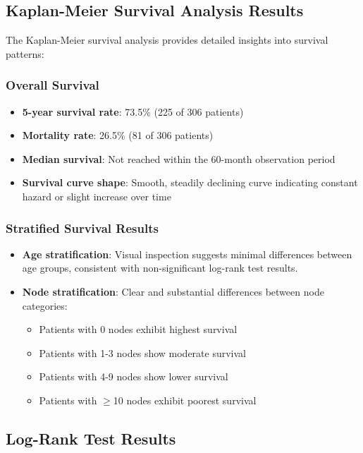 \documentclass[12pt,a4paper]{article}
\begin{document}
\subsection{Kaplan-Meier Survival Analysis Results}

The Kaplan-Meier survival analysis provides detailed insights into survival patterns:

\subsubsection{Overall Survival}

\begin{itemize}
    \item \textbf{5-year survival rate}: 73.5\% (225 of 306 patients)
    \item \textbf{Mortality rate}: 26.5\% (81 of 306 patients)
    \item \textbf{Median survival}: Not reached within the 60-month observation period
    \item \textbf{Survival curve shape}: Smooth, steadily declining curve indicating constant hazard or slight increase over time
\end{itemize}

\subsubsection{Stratified Survival Results}

\begin{itemize}
    \item \textbf{Age stratification}: Visual inspection suggests minimal differences between age groups, consistent with non-significant log-rank test results.
    
    \item \textbf{Node stratification}: Clear and substantial differences between node categories:
    \begin{itemize}
        \item Patients with 0 nodes exhibit highest survival
        \item Patients with 1-3 nodes show moderate survival
        \item Patients with 4-9 nodes show lower survival
        \item Patients with $\geq$10 nodes exhibit poorest survival
    \end{itemize}
\end{itemize}

\subsection{Log-Rank Test Results}
\end{document}
